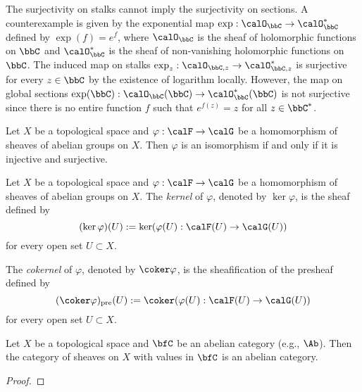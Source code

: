    \begin{remark}\label{prop:surjective_on_stalk_cannot_imply_on_sections}
        The surjectivity on stalks cannot imply the surjectivity on sections.
        A counterexample is given by the exponential map \(\exp : \calO_\bbC \to \calO_\bbC^*\) defined by \(\exp(f) = e^{f}\), 
        where \(\calO_\bbC\) is the sheaf of holomorphic functions on \(\bbC\) and \(\calO_\bbC^*\) is the sheaf of non-vanishing holomorphic functions on \(\bbC\).
        The induced map on stalks \(\exp_z : \calO_{\bbC,z} \to \calO_{\bbC,z}^*\) is surjective for every \(z \in \bbC\) by the existence of logarithm locally.
        However, the map on global sections \(\exp(\bbC) : \calO_\bbC(\bbC) \to \calO_\bbC^*(\bbC)\) is not surjective since there is no entire function \(f\) such that \(e^{f(z)} = z\) for all \(z \in \bbC^*\).
    \end{remark}

    \begin{proposition}\label{prop:isomorphism_of_homomorphism_of_sheaves}
        Let \(X\) be a topological space and \(\varphi : \calF \to \calG\) be a homomorphism of sheaves of abelian groups on \(X\).
        Then \(\varphi\) is an isomorphism if and only if it is injective and surjective.
    \end{proposition}


    \begin{definition}\label{def:ker_and_cokernel_of_homomorphisms_of_sheaves}
        Let \(X\) be a topological space and \(\varphi : \calF \to \calG\) be a homomorphism of sheaves of abelian groups on \(X\).
        The \emph{kernel} of \(\varphi\), denoted by \(\ker \varphi\), is the sheaf defined by 
        \[
            (\ker \varphi)(U) := \ker(\varphi(U) : \calF(U) \to \calG(U))
        \]
        for every open set \(U \subset X\).

        The \emph{cokernel} of \(\varphi\), denoted by \(\coker \varphi\), is the sheafification of the presheaf defined by 
        \[
            (\coker \varphi)_{\text{pre}}(U) := \coker(\varphi(U) : \calF(U) \to \calG(U))
        \]
        for every open set \(U \subset X\).
    \end{definition}

    \begin{theorem}\label{thm:sheaves_on_topological_space_is_an_abelian_category}
        Let \(X\) be a topological space and \(\bfC\) be an abelian category (e.g., \(\Ab\)).
        Then the category of sheaves on \(X\) with values in \(\bfC\) is an abelian category.
    \end{theorem}
    \begin{proof}
    \end{proof}


